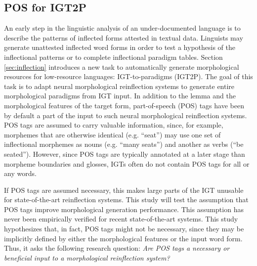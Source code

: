 

\subsection{POS for IGT2P}

An early step in the linguistic analysis of an under-documented language is to describe the patterns of inflected forms attested in textual data. 
Linguists may generate unattested inflected word forms in order to test a hypothesis of the inflectional patterns or to complete inflectional paradigm tables. Section \ref{sec:inflection} introduces a new task to automatically generate morphological resources for low-resource languages: IGT-to-paradigms (IGT2P).
The goal of this task is to adapt neural morphological reinflection systems to generate entire morphological paradigms from IGT input. In addition to the lemma and the morphological features of the target form, part-of-speech (POS) tags have been by default a part of the input to such neural morphological reinflection systems. POS tags are assumed to carry valuable information, since, for example, morphemes that are otherwise identical (e.g. ``seat'') may use one set of inflectional morphemes as nouns (e.g. ``many seats'') and another as verbs (``be seated''). However, since POS tags are typically annotated at a later stage than morpheme boundaries and glosses, IGTs often do not contain POS tags for all or any words.

If POS tags are assumed necessary, this makes large parts of the IGT unusable for state-of-the-art reinflection systems. This study will test the assumption that POS tags improve morphological generation performance. This assumption has never been empirically verified for recent state-of-the-art systems. This study hypothesizes that, in fact, POS tags might not be necessary, since they may be implicitly defined by either the morphological features or the input word form. 
Thus,
it asks the following research question: \textit{Are POS tags a necessary or beneficial input to a morphological reinflection system?} 

